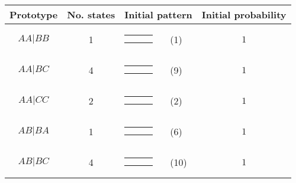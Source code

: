 \begin{center}
\begin{tabular}{ccrlc} \hline
Prototype & No. states & \multicolumn{2}{c}{Initial pattern} & Initial probability \\ \hline
$AA|BB$ & 1 & 
{\renewcommand{\arraystretch}{0.3}
\renewcommand{\tabcolsep}{0.5mm}
\parbox[b][3mm][c]{12mm}{
\begin{tabular}{|p{2mm}|p{2mm}||p{2mm}|} \hline
$\bullet$ & $\circ  $ &           \\
$\bullet$ & $\circ  $ &           \\ \hline
\end{tabular}}}
& (1) & $1$ \\
$AA|BC$ & 4 & 
{\renewcommand{\arraystretch}{0.3}
\renewcommand{\tabcolsep}{0.5mm}
\parbox[b][3mm][c]{12mm}{
\begin{tabular}{|p{2mm}|p{2mm}||p{2mm}|} \hline
$\bullet$ & $\circ  $ &           \\
$\bullet$ &           & $\circ  $ \\ \hline
\end{tabular}}}
& (9) & $1$ \\
$AA|CC$ & 2 & 
{\renewcommand{\arraystretch}{0.3}
\renewcommand{\tabcolsep}{0.5mm}
\parbox[b][3mm][c]{12mm}{
\begin{tabular}{|p{2mm}|p{2mm}||p{2mm}|} \hline
$\bullet$ &           & $\circ  $ \\
$\bullet$ &           & $\circ  $ \\ \hline
\end{tabular}}}
& (2) & $1$ \\
$AB|BA$ & 1 & 
{\renewcommand{\arraystretch}{0.3}
\renewcommand{\tabcolsep}{0.5mm}
\parbox[b][3mm][c]{12mm}{
\begin{tabular}{|p{2mm}|p{2mm}||p{2mm}|} \hline
$\bullet$ & $\circ  $ &           \\
$\circ  $ & $\bullet$ &           \\ \hline
\end{tabular}}}
& (6) & $1$ \\
$AB|BC$ & 4 & 
{\renewcommand{\arraystretch}{0.3}
\renewcommand{\tabcolsep}{0.5mm}
\parbox[b][3mm][c]{12mm}{
\begin{tabular}{|p{2mm}|p{2mm}||p{2mm}|} \hline
$\bullet$ & $\circ  $ &           \\
          & $\bullet$ & $\circ  $ \\ \hline
\end{tabular}}}
& (10) & $1$ \\

\end{tabular}
\end{center}
